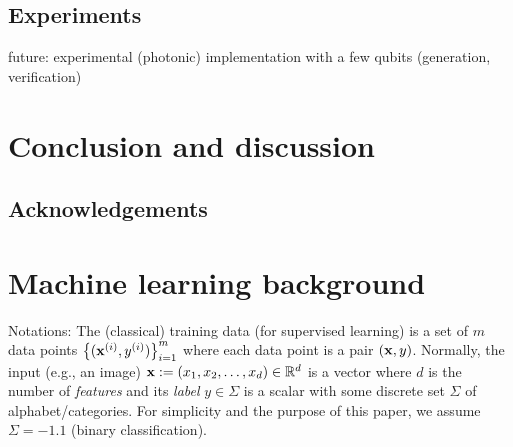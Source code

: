 \documentclass[
10pt,
aps,
pra,
linenumbers,
floatfix,
]{revtex4-2}
\theoremstyle{plain}
\theoremstyle{definition}
\begin{document}
% 
% 

\subsection{Experiments}
future: experimental (photonic) implementation with a few qubits (generation, verification) \cite{luEntanglementStructureEntanglement2018}

\section{Conclusion and discussion}

\subsection*{Acknowledgements}



%


\onecolumngrid
\appendix

\section{Machine learning background}

Notations:
The (classical) training data (for supervised learning) is a set of $m$ data points $\qty{(\vb{x}^{(i)}, y^{(i)})}^{m}_{i=1}$ 
where each data point is a pair $(\vb{x},y)$.
Normally, the input (e.g., an image) $\vb{x}:= (x_1,x_2,\dots,x_d) \in \mathbb{R}^d$  is a vector where $d$ is the number of \emph{features}
and its \emph{label} $y\in\Sigma$ is a scalar with some discrete set $\Sigma$ of alphabet/categories. 
For simplicity and the purpose of this paper, we assume $\Sigma=\qty{-1,1}$ (binary classification).
\end{document}

